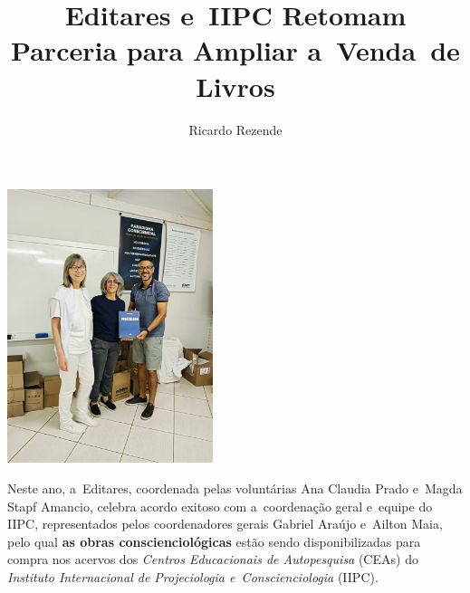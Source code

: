 \documentclass{gescons}
\author{Ricardo Rezende}
\title{Editares e~IIPC Retomam Parceria para Ampliar a~Venda~de Livros}
\begin{document}
    \makeentrevistatitle


    
    

\begin{center}
    \includegraphics[height=8cm,trim={130 200 100 300},clip]{articles/parceria/imagens/editares-iipc.jpeg}
\end{center}


    



\vspace{5mm}

Neste ano, a~Editares, coordenada pelas voluntárias Ana Claudia Prado e~Magda Stapf Amancio, celebra acordo exitoso com a~coordenação geral e~equipe do IIPC, representados pelos coordenadores gerais Gabriel Araújo e~Ailton Maia, pelo qual \textbf{as obras conscienciológicas} estão sendo disponibilizadas para compra nos acervos dos \emph{Centros Educacionais de Autopesquisa} (CEAs) do \emph{Instituto Internacional de Projeciologia e~Cons­cienciologia} (IIPC).
\end{document}
